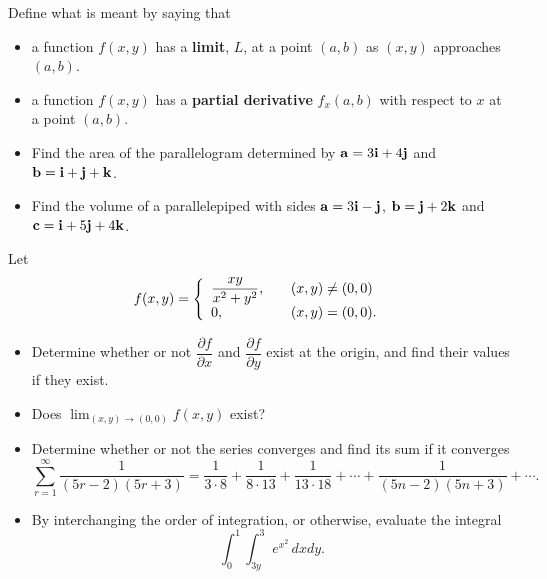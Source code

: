\documentclass[12pt]{uz-exame}
\begin{document}
 
\rubric{\science}
\makeheading
\sectionAscience
\begin{question}
Define what is meant by saying that 
\begin{itemize}
\item[(a)] a function $f(x,y)$ has a \textbf{limit}, $L$, at a point $(a,b)$ as $(x,y)$ approaches $(a,b)$. 
\item[(b)] a function $f(x,y)$ has a \textbf{partial derivative} $f_x(a,b)$ with respect to $x$ at a point $(a,b)$. 
\end{itemize}
\end{question}
\begin{question}
\begin{itemize}
\item[(a)] Find the area of the parallelogram determined by ${\bf{a}}=3{\bf{i}}+4{\bf{j}}$ and ${\bf{b}}={\bf{i}}+{\bf{j}}+{\bf{k}}$.
\item[(b)] Find the volume of a parallelepiped with sides ${\bf a}=3{\bf i}-{\bf j}$, ${\bf b}={\bf j}+2{\bf k}$ and ${\bf c}={\bf i}+5{\bf j}+4{\bf k}$.
\end{itemize}
\end{question}
\begin{question}
Let \[f(x,y) = \left\{ 
\begin{array}{l l}
  \dfrac{xy}{x^2+y^2}, & \quad (x,y)\neq (0,0)\\
  0, & \quad (x,y)=(0,0).\\ \end{array} \right. \]
  \begin{itemize}
  \item[(a)] Determine whether or not $\dfrac{\partial f}{\partial x}$ and $\dfrac{\partial f}{\partial y}$ exist at the origin, and find their values if they exist.
  \item[(b)] Does $\displaystyle \lim _{(x,y)\rightarrow (0,0)} f(x,y)$ exist? 
  \end{itemize}
\end{question}
\begin{question}
\begin{itemize}
\item[(a)] Determine whether or not the series converges and find its sum if it converges
\[\sum _{r=1}^\infty \dfrac{1}{(5r-2)(5r+3)}=\dfrac{1}{3\cdot 8}+\dfrac{1}{8\cdot 13}+\dfrac{1}{13\cdot 18}+\cdots +\dfrac{1}{(5n-2)(5n+3)} +\cdots .\]
\item[(b)] By interchanging the order of integration, or otherwise, evaluate the integral \[ \int _{0}^1\int _{3y}^3 e^{x^2}\, dxdy.\]
\end{itemize}
\end{question}
\end{document}
